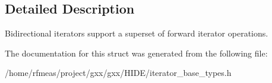 \subsection{Detailed Description}
Bidirectional iterators support a superset of forward iterator operations. 

The documentation for this struct was generated from the following file\+:\begin{DoxyCompactItemize}
\item 
/home/rfmeas/project/gxx/gxx/\+H\+I\+D\+E/iterator\+\_\+base\+\_\+types.\+h\end{DoxyCompactItemize}
